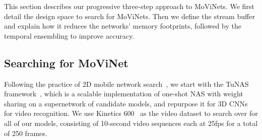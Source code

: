 \documentclass[final]{cvpr}
\newcommand{\ournet}{MoViNet\xspace} \newcommand{\ournets}{\ournet{}s\xspace}
\begin{document}
This section describes our progressive three-step approach to \ournets.
We first detail the design space to search for \ournets.
Then we define the stream buffer and explain how it reduces the networks' memory footprints, followed by the temporal ensembling to improve accuracy.

\subsection{Searching for \ournet} \label{sec:nas}
Following the practice of 2D mobile network search~\cite{tan2019mnasnet, tan2019efficientnet}, we start with the TuNAS framework~\cite{bender2020can}, which is a scalable implementation of one-shot NAS with weight sharing on a supernetwork of candidate models, and repurpose it for 3D CNNs for video recognition.
We use Kinetics 600~\cite{kay2017kinetics} as the video dataset to search over for all of our models, consisting of 10-second video sequences each at 25fps for a total of 250 frames.
\end{document}
